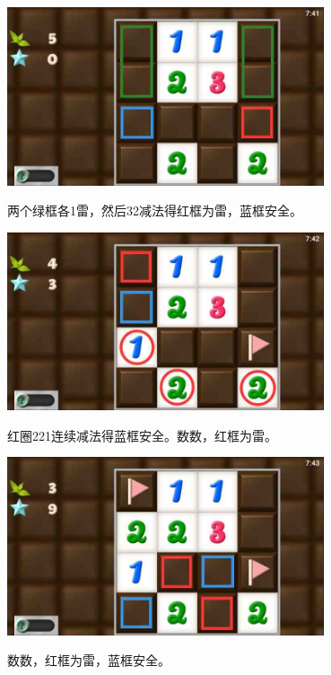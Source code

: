 \subsection{} %
\begin{center}
    \includegraphics[width=0.7\textwidth]{puzzlelow/45-1.jpg}
\end{center}
两个绿框各1雷，然后32减法得红框为雷，蓝框安全。
\begin{center}
    \includegraphics[width=0.7\textwidth]{puzzlelow/45-2.jpg}
\end{center}
红圈221连续减法得蓝框安全。数数，红框为雷。
\begin{center}
    \includegraphics[width=0.7\textwidth]{puzzlelow/45-3.jpg}
\end{center}
数数，红框为雷，蓝框安全。


